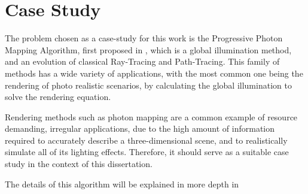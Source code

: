 \documentclass[main.tex]{subfiles}
\begin{document}
\section{Case Study}

The problem chosen as a case-study for this work is the Progressive Photon Mapping Algorithm, first proposed in \cite{hachisuka2008progressive}, which is a global illumination method, and an evolution of classical Ray-Tracing and Path-Tracing. This family of methods has a wide variety of applications, with the most common one being the rendering of photo realistic scenarios, by calculating the global illumination to solve the rendering equation.

Rendering methods such as photon mapping are a common example of resource demanding, irregular applications, due to the high amount of information required to accurately describe a three-dimensional scene, and to realistically simulate all of its lighting effects. Therefore, it should serve as a suitable case study in the context of this dissertation.

The details of this algorithm will be explained in more depth in 

\end{document}
